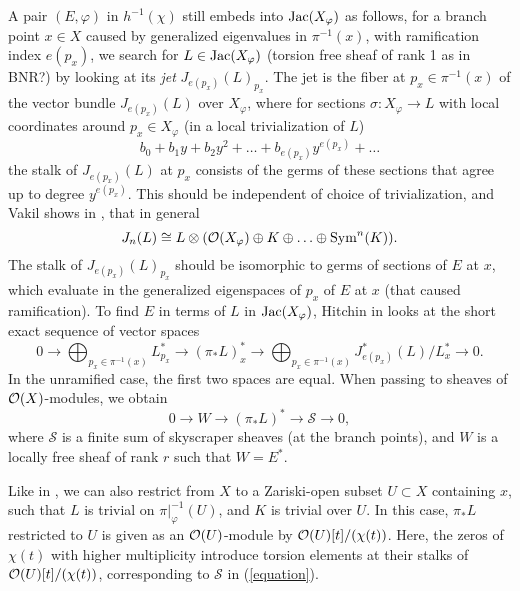 A pair $(E,\varphi)$ in $h^{-1}(\chi)$ still embeds into $\text{Jac}(X_\varphi)$ as follows, for a branch point $x\in X$ caused by generalized eigenvalues in $\pi^{-1}(x)$, with ramification index $e(p_x)$, we search for $L\in\text{Jac}(X_\varphi)$ (torsion free sheaf of rank 1 as in BNR?) by looking at its \textit{jet} $J_{e(p_x)}(L)_{p_x}$. The jet is the fiber at $p_x\in\pi^{-1}(x)$ of the vector bundle $J_{e(p_x)}(L)$ over $X_\varphi$, where for sections $\sigma:X_\varphi\rightarrow L$ with local coordinates around $p_x\in X_\varphi$ (in a local trivialization of $L$)
\begin{equation}
b_0+b_1y+b_2y^2+\ldots+b_{e(p_x)}y^{e(p_x)}+\ldots
\end{equation}
the stalk of $J_{e(p_x)}(L)$ at $p_x$ consists of the germs of these sections that agree up to degree $y^{e(p_x)}$. This should be independent of choice of trivialization, and Vakil shows in
\cite{vakil}, that in general
\begin{equation}
    J_n(L)\cong L\otimes (\mathcal{O}(X_\varphi)\oplus K\oplus\ldots\oplus\text{Sym}^n(K)).
\end{equation}
The stalk of $J_{e(p_x)}(L)_{p_x}$ should be isomorphic to germs of sections of $E$ at $x$, which evaluate in the generalized eigenspaces of $p_x$ of $E$ at $x$ (that caused ramification). To find $E$ in terms of $L$ in $\text{Jac}(X_\varphi)$, Hitchin in \cite{hitch} looks at the short exact sequence of vector spaces
\begin{equation}
    0\rightarrow \bigoplus_{p_x\in\pi^{-1}(x)}L_{p_x}^*\rightarrow(\pi_*L)^*_x\rightarrow\bigoplus_{p_x\in\pi^{-1}(x)}J^*_{e(p_x)}(L)/L_x^*\rightarrow0.
\end{equation}
In the unramified case, the first two spaces are equal. When passing to sheaves of $\mathcal{O}(X)$-modules, we obtain
\begin{equation}\label{equation}
    0\rightarrow W\rightarrow(\pi_*L)^*\rightarrow\mathcal{S}\rightarrow0,
\end{equation}
where $\mathcal{S}$ is a finite sum of skyscraper sheaves (at the branch points), and $W$ is a locally free sheaf of rank $r$ such that $W=E^*$.

Like in \cite[Proposition 2.2]{logmar}, we can also restrict from $X$ to a Zariski-open subset $U\subset X$ containing $x$, such that $L$ is trivial on $\pi|_{\varphi}^{-1}(U)$, and $K$ is trivial over $U$. In this case, $\pi_*L$ restricted to $U$ is given as an $\mathcal{O}(U)$-module by $\mathcal{O}(U)[t]/(\chi(t))$. Here, the zeros of $\chi(t)$ with higher multiplicity introduce torsion elements at their stalks of $\mathcal{O}(U)[t]/(\chi(t))$, corresponding to $\mathcal{S}$ in (\ref{equation}).

